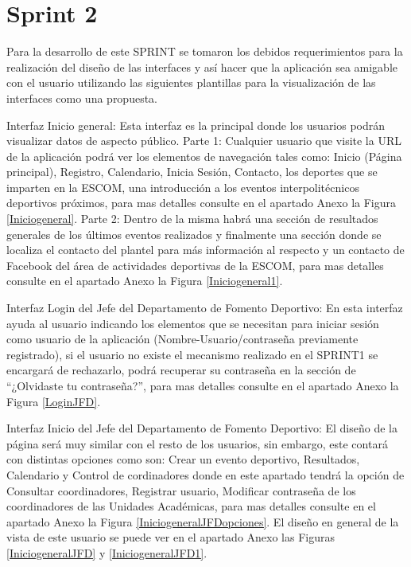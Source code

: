 	
	\section{Sprint 2}
	\noindent Para la desarrollo de este SPRINT se tomaron los debidos requerimientos para la realización del diseño de las interfaces y así hacer que la aplicación sea amigable con el usuario utilizando las siguientes plantillas para la visualización de las interfaces como una propuesta.
	\newline
	
	\noindent Interfaz Inicio general: Esta interfaz es la principal donde los usuarios podrán visualizar datos de aspecto público. 
	\newline
	Parte 1:
	Cualquier usuario que visite la URL de la aplicación podrá ver los elementos de navegación tales como: Inicio (Página principal), Registro, Calendario, Inicia Sesión, Contacto, los deportes que se imparten en la ESCOM, una introducción a los eventos interpolitécnicos deportivos próximos, para mas detalles consulte en el apartado Anexo la Figura \ref{Iniciogeneral}.
	\newline
	Parte 2:
	Dentro de la misma habrá una sección de resultados generales de los últimos eventos realizados y finalmente una  sección donde se localiza el contacto del plantel para más información al respecto y un contacto de Facebook del área de actividades deportivas de la ESCOM, para mas detalles consulte en el apartado Anexo la Figura \ref{Iniciogeneral1}.
	\newline
	
	\noindent Interfaz Login del Jefe del Departamento de Fomento Deportivo: En esta interfaz ayuda al usuario indicando los elementos que se necesitan para iniciar sesión como usuario de la aplicación (Nombre-Usuario/contraseña previamente registrado), si el usuario no existe el mecanismo realizado en el SPRINT1 se encargará de rechazarlo, podrá recuperar su contraseña en la sección de “¿Olvidaste tu contraseña?”, para mas detalles consulte en el apartado Anexo la Figura 	\ref{LoginJFD}. 
	\newline
	
	\noindent Interfaz Inicio del Jefe del Departamento de Fomento Deportivo: El diseño de la página será muy similar con el resto de los usuarios, sin embargo, este contará con distintas opciones como son: Crear un evento deportivo, Resultados, Calendario y Control de cordinadores donde en este apartado tendrá la opción de Consultar coordinadores, Registrar usuario, Modificar contraseña de los coordinadores de las Unidades Académicas, para mas detalles consulte en el apartado Anexo la Figura 	\ref{IniciogeneralJFDopciones}. El diseño en general de la vista de este usuario se puede ver en el apartado Anexo las Figuras \ref{IniciogeneralJFD} y \ref{IniciogeneralJFD1}.
	\newline
	
